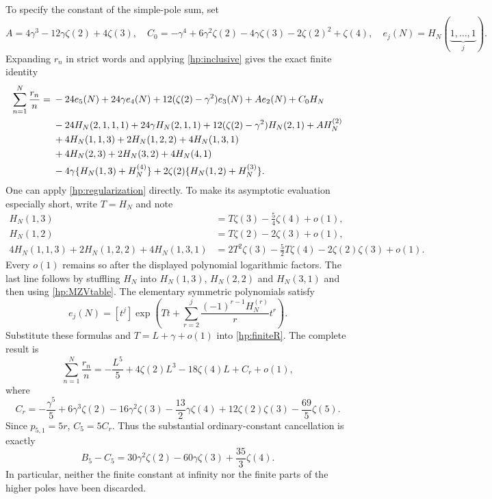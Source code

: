 To specify the constant of the simple-pole sum, set
\[
 A=4\gamma^3-12\gamma\zeta(2)+4\zeta(3),\quad
 C_0=-\gamma^4+6\gamma^2\zeta(2)-4\gamma\zeta(3)
                       -2\zeta(2)^2+\zeta(4),
 \quad e_j(N)=H_N(\underbrace{1,\ldots,1}_{j}).
\]
Expanding $r_n$ in strict words and applying
\eqref{hp:inclusive} gives the exact finite identity
\begin{align}\label{hp:finiteR}
 \sum_{n=1}^N\frac{r_n}{n}={}&-24e_5(N)+24\gamma e_4(N)
       +12(\zeta(2)-\gamma^2)e_3(N)+Ae_2(N)+C_0H_N\notag\\
 &-24H_N(2,1,1,1)+24\gamma H_N(2,1,1)
       +12(\zeta(2)-\gamma^2)H_N(2,1)+AH_N^{(2)}\notag\\
 &+4H_N(1,1,3)+2H_N(1,2,2)+4H_N(1,3,1)\notag\\
 &+4H_N(2,3)+2H_N(3,2)+4H_N(4,1)\notag\\
 &-4\gamma\{H_N(1,3)+H_N^{(4)}\}
          +2\zeta(2)\{H_N(1,2)+H_N^{(3)}\}.
\end{align}
One can apply \eqref{hp:regularization} directly. To make its
asymptotic evaluation especially short, write $T=H_N$ and note
\begin{align*}
 H_N(1,3)&=T\zeta(3)-\tfrac54\zeta(4)+o(1),\\
 H_N(1,2)&=T\zeta(2)-2\zeta(3)+o(1),\\
 4H_N(1,1,3)+2H_N(1,2,2)+4H_N(1,3,1)
   &=2T^2\zeta(3)-\tfrac52T\zeta(4)
                                  -2\zeta(2)\zeta(3)+o(1).
\end{align*}
Every $o(1)$ remains so after the displayed polynomial logarithmic
factors. The last line follows by stuffling $H_N$ into
$H_N(1,3)$, $H_N(2,2)$ and $H_N(3,1)$ and then using
\eqref{hp:MZVtable}. The elementary symmetric polynomials satisfy
\[
 e_j(N)=[t^j]\exp\left(Tt+
           \sum_{r=2}^j\frac{(-1)^{r-1}H_N^{(r)}}r t^r\right).
\]
Substitute these formulas and $T=L+\gamma+o(1)$ into
\eqref{hp:finiteR}. The complete result is
\begin{equation}\label{hp:Casym}
 \sum_{n=1}^N\frac{r_n}{n}
   =-\frac{L^5}{5}+4\zeta(2)L^3-18\zeta(4)L+C_r+o(1),
\end{equation}
where
\begin{equation}\label{hp:Cr}
 C_r=-\frac{\gamma^5}{5}+6\gamma^3\zeta(2)
      -16\gamma^2\zeta(3)-\frac{13}{2}\gamma\zeta(4)
      +12\zeta(2)\zeta(3)-\frac{69}{5}\zeta(5).
\end{equation}
Since $p_{5,1}=5r$, $C_5=5C_r$. Thus the substantial ordinary-constant
cancellation is exactly
\begin{equation}\label{hp:BCcancel}
 B_5-C_5=30\gamma^2\zeta(2)-60\gamma\zeta(3)+\frac{35}{3}\zeta(4).
\end{equation}
In particular, neither the finite constant at infinity nor the
finite parts of the higher poles have been discarded.

